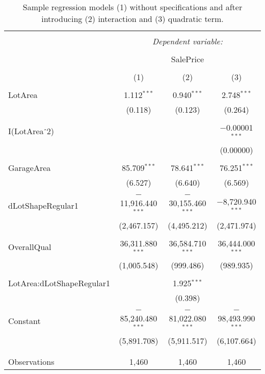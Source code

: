 \documentclass{article}
\begin{document}
\begin{table}[h]
\centering
\caption{\label{tab:sampleregression} Sample regression models (1) without specifications and after introducing (2) interaction and (3) quadratic term.}
\begin{tabular}{@{\extracolsep{5pt}}lccc} 
\\[-1.8ex]\hline 
\hline \\[-1.8ex] 
 & \multicolumn{3}{c}{\textit{Dependent variable:}} \\ 
\cline{2-4} 
\\[-1.8ex] & \multicolumn{3}{c}{SalePrice} \\ 
\\[-1.8ex] & (1) & (2) & (3)\\ 
\hline \\[-1.8ex] 
 LotArea & 1.112$^{***}$ & 0.940$^{***}$ & 2.748$^{***}$ \\ 
  & (0.118) & (0.123) & (0.264) \\ 
  & & & \\ 
 I(LotArea$\hat{\mkern6mu}$2) &  &  & $-$0.00001$^{***}$ \\ 
  &  &  & (0.00000) \\ 
  & & & \\ 
 GarageArea & 85.709$^{***}$ & 78.641$^{***}$ & 76.251$^{***}$ \\ 
  & (6.527) & (6.640) & (6.569) \\ 
  & & & \\ 
 dLotShapeRegular1 & $-$11,916.440$^{***}$ & $-$30,155.460$^{***}$ & $-$8,720.940$^{***}$ \\ 
  & (2,467.157) & (4,495.212) & (2,471.974) \\ 
  & & & \\ 
 OverallQual & 36,311.880$^{***}$ & 36,584.710$^{***}$ & 36,444.000$^{***}$ \\ 
  & (1,005.548) & (999.486) & (989.935) \\ 
  & & & \\ 
 LotArea:dLotShapeRegular1 &  & 1.925$^{***}$ &  \\ 
  &  & (0.398) &  \\ 
  & & & \\ 
 Constant & $-$85,240.480$^{***}$ & $-$81,022.080$^{***}$ & $-$98,493.990$^{***}$ \\ 
  & (5,891.708) & (5,911.517) & (6,107.664) \\ 
  & & & \\ 
\hline \\[-1.8ex] 
Observations & 1,460 & 1,460 & 1,460 \\ 

\end{tabular}
\end{table}
\end{document}
